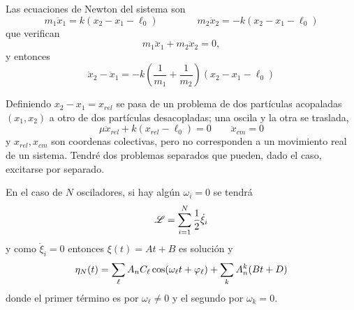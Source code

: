 \documentclass[10pt,oneside]{CBFT_book}
\begin{document}
Las ecuaciones de Newton del sistema son
\[
	m_1 \ddot{x}_1 = k(x_2-x_1-\ell_0) \qquad \qquad m_2 \ddot{x}_2 = -k(x_2-x_1-\ell_0)
\]
que verifican
\[
	m_1 \ddot{x}_1 + m_2 \ddot{x}_2 = 0,
\]
y entonces
\[
	\ddot{x}_2 - \ddot{x}_1 = -k \left( \frac{1}{m_1} + \frac{1}{m_2} \right) ( x_2-x_1-\ell_0 )
\]

Definiendo $x_2-x_1 = x_{rel}$ se pasa de un problema de dos partículas acopaladas $(x_1,x_2)$ a otro de dos partículas
desacopladas; una oscila y la otra se traslada,
\[
	\mu \ddot{x}_{rel} + k (x_{rel} - \ell_0 ) = 0 \qquad \ddot{x}_{cm} = 0
\]
y $x_{rel}, x_{cm}$ son coordenas colectivas, pero no corresponden a un movimiento real de un sistema.
Tendré dos problemas separados que pueden, dado el caso, excitarse por separado.

En el caso de $N$ osciladores, si hay algún $\omega_i=0$ se tendrá
\[
	\mathscr{L} = \sum_{i=1}^N \frac{ 1 }{ 2} \dot{\xi}_i
\]
y como $\ddot{\xi}_i = 0 $ entonces $\xi(t) = At + B$ es solución y 
\[
	\eta_N(t) = \sum_\ell A_n C_\ell \cos (\omega_\ell t + \varphi_\ell) + \sum_k A_n^k (Bt + D)
\]
donde el primer término es por $\omega_\ell\neq 0$ y el segundo por $\omega_k=0$.
\end{document}
